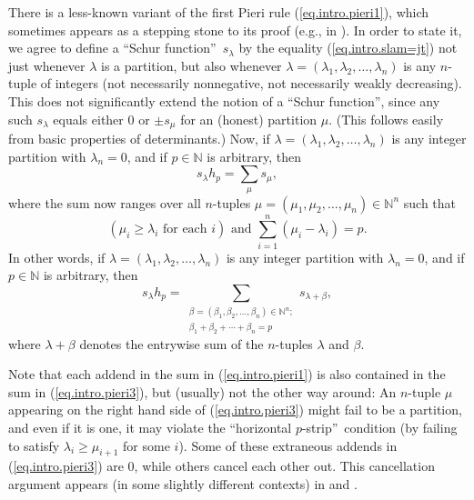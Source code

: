 \documentclass[numbers=enddot,12pt,final,onecolumn,notitlepage,english]{scrartcl}%
\theoremstyle{definition}
\let\sumnonlimits\sum
\renewcommand{\sum}{\sumnonlimits\limits}
\begin{document}
There is a less-known variant of the first Pieri rule (\ref{eq.intro.pieri1}),
which sometimes appears as a stepping stone to its proof (e.g., in
\cite[\S 2.4]{Tamvak13}). In order to state it, we agree to define a
\textquotedblleft Schur function\textquotedblright\ $s_{\lambda}$ by the
equality (\ref{eq.intro.slam=jt}) not just whenever $\lambda$ is a partition,
but also whenever $\lambda=\left(  \lambda_{1},\lambda_{2},\ldots,\lambda
_{n}\right)  $ is any $n$-tuple of integers (not necessarily nonnegative, not
necessarily weakly decreasing). This does not significantly extend the notion
of a \textquotedblleft Schur function\textquotedblright, since any such
$s_{\lambda}$ equals either $0$ or $\pm s_{\mu}$ for an (honest) partition
$\mu$. (This follows easily from basic properties of determinants.) Now, if
$\lambda=\left(  \lambda_{1},\lambda_{2},\ldots,\lambda_{n}\right)  $ is any
integer partition with $\lambda_{n}=0$, and if $p\in\mathbb{N}$ is arbitrary,
then%
\begin{equation}
s_{\lambda}h_{p}=\sum_{\mu}s_{\mu}, \label{eq.intro.pieri3}%
\end{equation}
where the sum now ranges over all $n$-tuples $\mu=\left(  \mu_{1},\mu
_{2},\ldots,\mu_{n}\right)  \in\mathbb{N}^{n}$ such that
\[
\left(  \mu_{i}\geq\lambda_{i}\text{ for each }i\right)  \text{ and }%
\sum_{i=1}^{n}\left(  \mu_{i}-\lambda_{i}\right)  =p.
\]
In other words, if $\lambda=\left(  \lambda_{1},\lambda_{2},\ldots,\lambda
_{n}\right)  $ is any integer partition with $\lambda_{n}=0$, and if
$p\in\mathbb{N}$ is arbitrary, then%
\begin{equation}
s_{\lambda}h_{p}=\sum_{\substack{\beta=\left(  \beta_{1},\beta_{2}%
,\ldots,\beta_{n}\right)  \in\mathbb{N}^{n};\\\beta_{1}+\beta_{2}+\cdots
+\beta_{n}=p}}s_{\lambda+\beta}, \label{eq.intro.pieri3b}%
\end{equation}
where $\lambda+\beta$ denotes the entrywise sum of the $n$-tuples $\lambda$
and $\beta$.

Note that each addend in the sum in (\ref{eq.intro.pieri1}) is also contained
in the sum in (\ref{eq.intro.pieri3}), but (usually) not the other way around:
An $n$-tuple $\mu$ appearing on the right hand side of (\ref{eq.intro.pieri3})
might fail to be a partition, and even if it is one, it may violate the
\textquotedblleft horizontal $p$-strip\textquotedblright\ condition (by
failing to satisfy $\lambda_{i}\geq\mu_{i+1}$ for some $i$). Some of these
extraneous addends in (\ref{eq.intro.pieri3}) are $0$, while others cancel
each other out. This cancellation argument appears (in some slightly different
contexts) in \cite[Lemma 2]{Tamvak13} and \cite[(2.1) vs. (2.2)]{LakTho07}.
\end{document}

